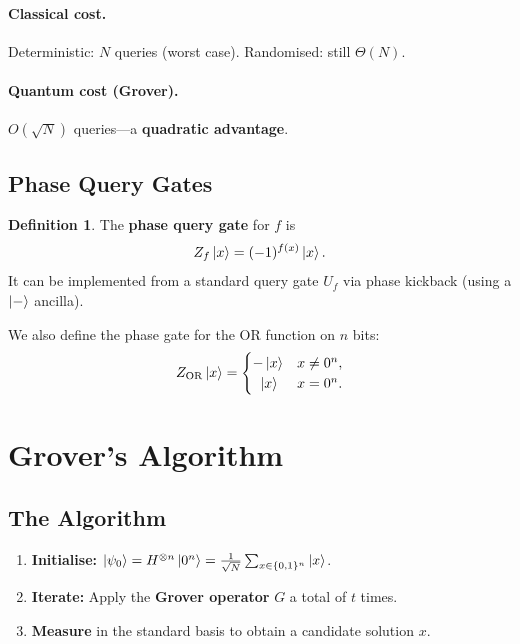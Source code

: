 \documentclass[11pt]{article}
\theoremstyle{definition}
\newtheorem{definition}{Definition}[section]
\begin{document}
\paragraph{Classical cost.}  Deterministic: $N$ queries (worst case).  Randomised: still $\Theta(N)$.

\paragraph{Quantum cost (Grover).}  $O(\sqrt{N})$ queries---a \textbf{quadratic advantage}.

\subsection{Phase Query Gates}

\begin{definition}
The \textbf{phase query gate} for $f$ is
\[
    Z_f\ket{x} = (-1)^{f(x)}\ket{x}.
\]
It can be implemented from a standard query gate $U_f$ via phase kickback (using a $\ket{-}$ ancilla).
\end{definition}

We also define the phase gate for the OR function on $n$ bits:
\[
    Z_{\mathrm{OR}}\ket{x} = \begin{cases}-\ket{x} & x\neq 0^n,\\ \;\;\ket{x} & x=0^n.\end{cases}
\]

\section{Grover's Algorithm}

\subsection{The Algorithm}

\begin{enumerate}
    \item \textbf{Initialise:} $\ket{\psi_0}=H^{\otimes n}\ket{0^n}=\frac{1}{\sqrt{N}}\sum_{x\in\{0,1\}^n}\ket{x}$.
    \item \textbf{Iterate:} Apply the \textbf{Grover operator} $G$ a total of $t$ times.
    \item \textbf{Measure} in the standard basis to obtain a candidate solution $x$.
\end{enumerate}
\end{document}
